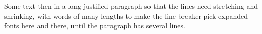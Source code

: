 \documentclass{article}
\begin{document}
Some text then  in a long
justified paragraph so that the lines need stretching and shrinking, with
words  of many lengths to make the
line breaker pick expanded fonts here and there,  until the paragraph has several lines.

\end{document}

